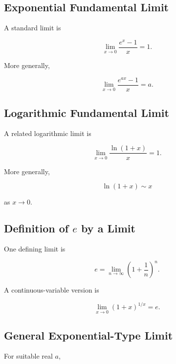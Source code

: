 \subsection{Exponential Fundamental Limit}
\label{subsec:exponential-fundamental-limit}

A standard limit is

\[
\boxed{
\lim_{x\to0}
\frac{e^x-1}{x}
=
1.
}
\]

More generally,

\[
\boxed{
\lim_{x\to0}
\frac{e^{ax}-1}{x}
=
a.
}
\]

\subsection{Logarithmic Fundamental Limit}
\label{subsec:logarithmic-fundamental-limit}

A related logarithmic limit is

\[
\boxed{
\lim_{x\to0}
\frac{\ln(1+x)}{x}
=
1.
}
\]

More generally,

\[
\boxed{
\ln(1+x)
\sim
x
}
\]

as \(x\to0\).

\subsection{Definition of \(e\) by a Limit}
\label{subsec:e-limit-reference}

One defining limit is

\[
\boxed{
e
=
\lim_{n\to\infty}
\left(
1+\frac1n
\right)^n.
}
\]

A continuous-variable version is

\[
\boxed{
\lim_{x\to0}
(1+x)^{1/x}
=
e.
}
\]

\subsection{General Exponential-Type Limit}
\label{subsec:general-exponential-type-limit}

For suitable real \(a\),

